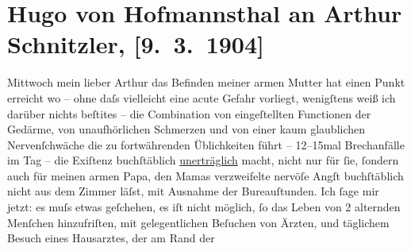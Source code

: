 

         \renewcommand{\erwaehnteWerke}{}
               \section[Hugo von Hofmannsthal an Arthur Schnitzler, {[}9. 3. 1904{]}]{ Hugo von Hofmannsthal an Arthur Schnitzler, {[}9. 3. 1904{]}}\nopagebreak{}\rehead{ }\begin{ledgroupsized}[t]{13cm}\normalsize\beginnumbering \toendnotes[C]{\smallbreak\pagebreak[2]} 
\toendnotes[C]{\smallbreak}\pstart
           \raggedleft{}{\pb}Mittwoch\pend
           \pstart{}mein lieber Arthur\pend\pstart
           das Befinden meiner armen Mutter hat einen Punkt erreicht wo – ohne daſs vielleicht eine acute Gefahr
               vorliegt, wenigſtens weiß ich darüber nichts beſti{\geminationm}tes –
               die Combination von eingeſtellten Functionen der Gedärme, von unaufhörlichen
               Schmerzen und von einer kaum glaublichen Nerven{\pb}ſchwäche die zu fortwährenden
               Üblichkeiten führt – 12–15mal Brechanfälle im Tag – die Exiſtenz buchſtäblich \uline{unerträglich} macht, nicht nur für ſie, ſondern auch
               für meinen armen Papa, den Mamas verzweifelte nervöſe Angſt
               buchſtäblich nicht aus dem Zimmer läſst, mit Ausnahme der Bureauſtunden.\pend
           \pstart
           Ich ſage mir jetzt: es muſs {\pb}etwas
               geſchehen, es iſt nicht möglich, ſo das Leben von 2 alternden Menſchen hinzufriſten,
               mit gelegentlichen Beſuchen von Ärzten, und täglichem Besuch eines Hausarztes, der am Rand der

\end{ledgroupsized}
